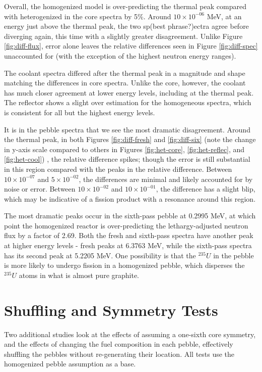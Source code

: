Overall, the homogenized model is over-predicting the thermal peak compared with heterogenized in the core spectra by 5\%.  Around $10\times10^{-06}$ MeV, at an energy just above the thermal peak, the two sp(best phrase?)ectra agree before diverging again, this time with a slightly greater disagreement.  Unlike Figure \ref{fig:diff-flux}, error alone leaves the relative differences seen in Figure \ref{fig:diff-spec} unaccounted for (with the exception of the highest neutron energy ranges).

The coolant spectra differed after the thermal peak in a magnitude and shape matching the differences in core spectra.  Unlike the core, however, the coolant has much closer agreement at lower energy levels, including at the thermal peak.  The reflector shows a slight over estimation for the homogeneous spectra, which is consistent for all but the highest energy levels.

It is in the pebble spectra that we see the most dramatic disagreement.  Around the thermal peak, in both Figures \ref{fig:diff-fresh} and \ref{fig:diff-six} (note the change in y-axis scale compared to others in Figures \ref{fig:het-core}, \ref{fig:het-reflec}, and \ref{fig:het-cool}) , the relative difference spikes; though the error is still substantial in this region compared with the peaks in the relative difference.  Between $10\times10^{-07}$ and $5\times10^{-02}$, the differences are minimal and likely accounted for by noise or error.  Between $10\times10^{-02}$ and $10\times10^{-01}$, the difference has a slight blip, which may be indicative of a fission product with a resonance around this region.

The most dramatic peaks occur in the sixth-pass pebble at 0.2995 MeV, at which point the homogenized reactor is over-predicting the lethargy-adjusted neutron flux by a factor of 2.69.  Both the fresh and sixth-pass spectra have another peak at higher energy levels - fresh peaks at 6.3763 MeV, while the sixth-pass spectra has its second peak at 5.2205 MeV.  One possibility is that the $^{235}U$ in the pebble is more likely to undergo fission in a homogenized pebble, which disperses the $^{235}U$ atoms in what is almost pure graphite.



\section{Shuffling and Symmetry Tests}
Two additional studies look at the effects of assuming a one-sixth core symmetry, and the effects of changing the fuel composition in each pebble, effectively shuffling the pebbles without re-generating their location.  All tests use the homogenized pebble assumption as a base.

